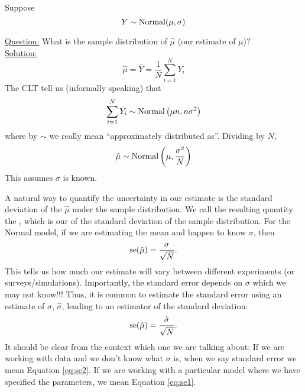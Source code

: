 \begin{example}
Suppose 
\begin{equation*}
Y \sim {\rm Normal}(\mu,\sigma)
\end{equation*}


\noindent
\underline{Question:} What is the sample distribution of $\hat{\mu}$ (our estimate of $\mu$)?\\

\noindent
\underline{Solution:}
\begin{equation*}
\hat{\mu} = \bar{Y} = \frac{1}{N}\sum_{i=1}^NY_i
\end{equation*}
The CLT tell us (informally speaking) that 
\begin{equation*}
\sum_{i=1}^NY_i \sim {\rm Normal}\left(\mu n,n\sigma^2 \right)
\end{equation*}
where by $\sim$ we really mean ``approximately distributed as''. Dividing by $N$, 
\begin{equation*}
\hat{\mu} \sim {\rm Normal}\left(\mu ,\frac{\sigma^2}{N} \right)
\end{equation*}
This assumes $\sigma$ is known.

\end{example} 

 A natural way to quantify the uncertainty in our estimate is the standard deviation of the $\hat{\mu}$ under the sample distribution.  We call the resulting quantity the , which is our  of the standard deviation of the sample distribution.  For the Normal model, if we are estimating the mean and happen to know $\sigma$, then 
\begin{equation}\label{eq:se1}
{\rm se}(\hat{\mu}) =  \frac{\sigma}{\sqrt{N}}. 
\end{equation}
This tells us how much our estimate will vary between different experiments (or surveys/simulations). 
Importantly, the standard error depends on $\sigma$ which we may not know!!! Thus, it is common to estimate the standard error using an estimate of $\sigma$, $\hat{\sigma}$, leading to an estimator of the standard deviation:
\begin{equation}\label{eq:se2}
{\rm se}(\hat{\mu}) =  \frac{\hat{\sigma}}{\sqrt{N}}. 
\end{equation}
It should be clear from the context which one we are talking about: If we are working with data and we don't know what $\sigma$ is, when we say standard error we mean Equation \ref{eq:se2}. If we are working with a particular model where we have specified the parameters, we mean Equation \ref{eq:se1}. 







